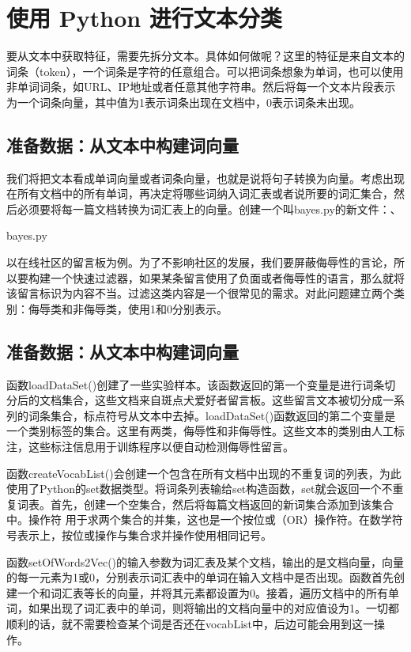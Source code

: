 \section{使用 Python 进行文本分类}
要从文本中获取特征，需要先拆分文本。具体如何做呢？这里的特征是来自文本的词条（token），一个词条是字符的任意组合。可以把词条想象为单词，也可以使用非单词词条，如URL、IP地址或者任意其他字符串。然后将每一个文本片段表示为一个词条向量，其中值为1表示词条出现在文档中，0表示词条未出现。

\subsection{准备数据：从文本中构建词向量}
我们将把文本看成单词向量或者词条向量，也就是说将句子转换为向量。考虑出现在所有文档中的所有单词，再决定将哪些词纳入词汇表或者说所要的词汇集合，然后必须要将每一篇文档转换为词汇表上的向量。创建一个叫bayes.py的新文件：、
\begin{tcolorbox}
    bayes.py
\end{tcolorbox}

以在线社区的留言板为例。为了不影响社区的发展，我们要屏蔽侮辱性的言论，所以要构建一个快速过滤器，如果某条留言使用了负面或者侮辱性的语言，那么就将该留言标识为内容不当。过滤这类内容是一个很常见的需求。对此问题建立两个类别：侮辱类和非侮辱类，使用1和0分别表示。

\subsection{准备数据：从文本中构建词向量}
函数loadDataSet()创建了一些实验样本。该函数返回的第一个变量是进行词条切分后的文档集合，这些文档来自斑点犬爱好者留言板。这些留言文本被切分成一系列的词条集合，标点符号从文本中去掉。loadDataSet()函数返回的第二个变量是一个类别标签的集合。这里有两类，侮辱性和非侮辱性。这些文本的类别由人工标注，这些标注信息用于训练程序以便自动检测侮辱性留言。

函数createVocabList()会创建一个包含在所有文档中出现的不重复词的列表，为此使用了Python的set数据类型。将词条列表输给set构造函数，set就会返回一个不重复词表。首先，创建一个空集合，然后将每篇文档返回的新词集合添加到该集合中。操作符 \textbar 用于求两个集合的并集，这也是一个按位或（OR）操作符。在数学符号表示上，按位或操作与集合求并操作使用相同记号。

函数setOfWords2Vec()的输入参数为词汇表及某个文档，输出的是文档向量，向量的每一元素为1或0，分别表示词汇表中的单词在输入文档中是否出现。函数首先创建一个和词汇表等长的向量，并将其元素都设置为0。接着，遍历文档中的所有单词，如果出现了词汇表中的单词，则将输出的文档向量中的对应值设为1。一切都顺利的话，就不需要检查某个词是否还在vocabList中，后边可能会用到这一操作。

